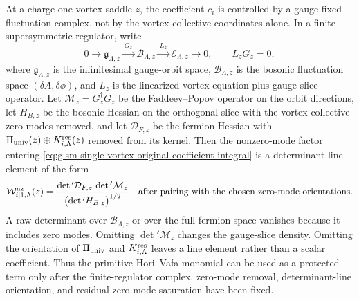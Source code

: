 \begin{proposition}
\label{prop:glsm-vortex-fluctuation-complex}
At a charge-one vortex saddle \(z\), the coefficient \(c_i\) is controlled by
a gauge-fixed fluctuation complex, not by the vortex collective coordinates
alone.  In a finite supersymmetric regulator, write
\[
  0\longrightarrow
  \mathfrak g_{\Lambda,z}
  \xrightarrow{\ G_z\ }
  \mathcal B_{\Lambda,z}
  \xrightarrow{\ L_z\ }
  \mathcal E_{\Lambda,z}
  \longrightarrow 0,
  \qquad L_zG_z=0,
\]
where \(\mathfrak g_{\Lambda,z}\) is the infinitesimal gauge-orbit space,
\(\mathcal B_{\Lambda,z}\) is the bosonic fluctuation space
\((\delta A,\delta\phi)\), and \(L_z\) is the linearized vortex equation plus
gauge-slice operator.  Let \(\mathcal M_z=G_z^\dagger G_z\) be the
Faddeev--Popov operator on the orbit directions, let \(H_{B,z}\) be the
bosonic Hessian on the orthogonal slice with the vortex collective zero modes
removed, and let \(\mathcal D_{F,z}\) be the fermion Hessian with
\(\Pi_{\rm univ}(z)\oplus K^{\rm res}_{i,\Lambda}(z)\) removed from its
kernel.  Then the nonzero-mode factor entering
\eqref{eq:glsm-single-vortex-original-coefficient-integral} is a determinant-line
element of the form
\begin{equation}
  \mathcal W_{i|1,\Lambda}^{\rm nz}(z)
  =
  \frac{
    \det{}' \mathcal D_{F,z}\,
    \det{}'\mathcal M_z
  }{
    \bigl(\det{}'H_{B,z}\bigr)^{1/2}
  }
  \quad
  \hbox{after pairing with the chosen zero-mode orientations.}
  \label{eq:glsm-vortex-nonzero-mode-determinant-complex}
\end{equation}
A raw determinant over \(\mathcal B_{\Lambda,z}\) or over the full fermion
space vanishes because it includes zero modes.  Omitting
\(\det{}'\mathcal M_z\) changes the gauge-slice density.  Omitting the
orientation of \(\Pi_{\rm univ}\) and \(K^{\rm res}_{i,\Lambda}\) leaves a
line element rather than a scalar coefficient.  Thus the primitive
Hori--Vafa monomial can be used as a protected term only after the
finite-regulator complex, zero-mode removal, determinant-line orientation,
and residual zero-mode saturation have been fixed.
\end{proposition}

